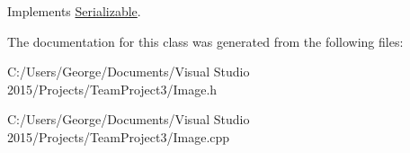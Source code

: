 Implements \hyperlink{class_serializable_a60c53d8ec7e38531699d1ca19642318d}{Serializable}.



The documentation for this class was generated from the following files\+:\begin{DoxyCompactItemize}
\item 
C\+:/\+Users/\+George/\+Documents/\+Visual Studio 2015/\+Projects/\+Team\+Project3/Image.\+h\item 
C\+:/\+Users/\+George/\+Documents/\+Visual Studio 2015/\+Projects/\+Team\+Project3/Image.\+cpp\end{DoxyCompactItemize}
